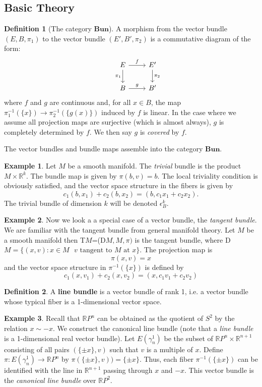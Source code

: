 \documentclass{article}
\theoremstyle{definition}
\newtheorem{ex}{Example}[section]
\newtheorem{defn}{Definition}[section]
\newcommand{\R}{\mathbb{R}}
\newcommand{\cat}{\mathbf}
\begin{document}
\subsection{Basic Theory}
\begin{defn}[The category $\cat{Bun}$]
A morphism from the vector bundle $(E,B,\pi_{1})$ to the vector bundle $(E',B',\pi_{2})$ is a commutative diagram of the form:
\[
\begin{tikzcd}
&E\arrow[r,"f"]\arrow[d,"\pi_{1}"'] &E'\arrow[d,"\pi_{2}"]\\
&B\arrow[r,"g"] &B'
\end{tikzcd}
\]
where $f$ and $g$ are continuous and, for all $x\in B$, the map \\$\pi_{1}^{-1}(\{x\})\rightarrow\pi_{2}^{-1}(\{g(x)\})$ induced by $f$ is linear. In the case where we assume all projection maps are surjective (which is almost always), $g$ is completely determined by $f$. We then say $g$ is \textit{covered} by $f$. 

The vector bundles and bundle maps assemble into the category $\cat{Bun}$.
\end{defn}
\begin{ex}
Let $M$ be a smooth manifold. The \textit{trivial} bundle is the product $M\times\R^{k}$. The bundle map is given by $\pi(b,v)=b.$ The local triviality condition is obviously satisfied, and the vector space structure in the fibers is given by 
\[c_{1}(b,x_{1})+c_{2}(b,x_{2})=(b,c_{1}x_{1}+c_{2}x_{2}).\] The trivial bundle of dimension $k$ will be denoted $\epsilon_{B}^{k}.$
\end{ex}
\begin{ex}
Now we look a a special case of a vector bundle, the \textit{tangent bundle}. We are familiar with the tangent bundle from general manifold theory. Let $M$ be a smooth manifold then T$M$=(D$M,M, \pi)$ is the tangent bundle, where D$M=\{(x,v): x\in M \,\,\,\, v\,\,\text{tangent to}\,\, M \,\,\text{at}\,\,x \}$. The projection map is $$\pi(x,v)=x$$ and the vector space structure in $\pi^{-1}(\{x\})$ is defined by $$c_1(x,v_1)+c_2(x,v_2)=(x,c_1v_1+c_2v_2)$$
\end{ex}
\begin{defn}
A \textbf{line bundle} is a vector bundle of rank 1, i.e. a vector bundle whose typical fiber is a 1-dimensional vector space. 
\end{defn}
\begin{ex}
Recall that $\R P^{n}$ can be obtained as the quotient of $S^{2}$ by the relation $x\sim -x$. We construct the canonical line bundle (note that a \textit{line bundle} is a 1-dimensional real vector bundle). Let $E(\gamma^{1}_{n})$ be the subset of $\R P^{n}\times\R^{n+1}$ consisting of all pairs $(\{\pm x \},v)$ such that $v$ is a multiple of $x$. Define $\pi:E(\gamma^{1}_{n})\rightarrow \R P^{n}$ by $\pi(\{\pm x \},v))=\{\pm x\}$. Thus, each fiber $\pi^{-1}(\{\pm x\})$ can be identified with the line in $\R^{n+1}$ passing through $x$ and $-x$. This vector bundle is the \textit{canonical line bundle} over $\R P^{2}.$
\end{ex}
\end{document}
